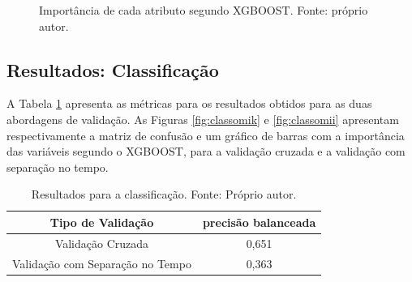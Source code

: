 \begin{figure}[H]
\center
{}
\caption{Importância de cada atributo segundo XGBOOST. Fonte: próprio autor.}\label{fig:rego}
\end{figure}


\subsection{Resultados: Classificação}

A Tabela \ref{tab:results_class} apresenta as métricas para os resultados obtidos para as duas abordagens de validação. As Figuras \ref{fig:classomik} e \ref{fig:classomii} apresentam respectivamente a matriz de confusão e um gráfico de barras com a importância das variáveis segundo o XGBOOST, para a validação cruzada e a validação com separação no tempo.

\begin{table}[H]
\begin{center}
\begin{tabular}{|c|c|}
\hline
Tipo de Validação & precisão balanceada   \\ \hline
Validação Cruzada                   & 0,651    \\ \hline
Validação com Separação no Tempo    & 0,363     \\ \hline
\end{tabular}
\end{center}
\vspace{12pt}
\caption{Resultados para a classificação. Fonte: Próprio autor.}
\label{tab:results_class}
\end{table}

